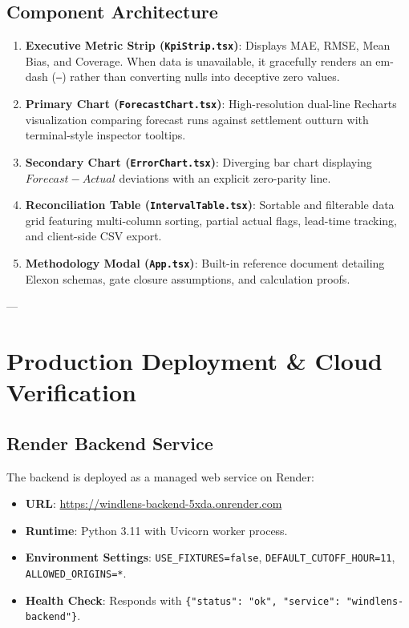 \documentclass[11pt,a4paper]{article}
\begin{document}
\subsection{Component Architecture}
\begin{enumerate}
    \item \textbf{Executive Metric Strip (\texttt{KpiStrip.tsx})}: Displays MAE, RMSE, Mean Bias, and Coverage. When data is unavailable, it gracefully renders an em-dash (\texttt{---}) rather than converting nulls into deceptive zero values.
    \item \textbf{Primary Chart (\texttt{ForecastChart.tsx})}: High-resolution dual-line Recharts visualization comparing forecast runs against settlement outturn with terminal-style inspector tooltips.
    \item \textbf{Secondary Chart (\texttt{ErrorChart.tsx})}: Diverging bar chart displaying $Forecast - Actual$ deviations with an explicit zero-parity line.
    \item \textbf{Reconciliation Table (\texttt{IntervalTable.tsx})}: Sortable and filterable data grid featuring multi-column sorting, partial actual flags, lead-time tracking, and client-side CSV export.
    \item \textbf{Methodology Modal (\texttt{App.tsx})}: Built-in reference document detailing Elexon schemas, gate closure assumptions, and calculation proofs.
\end{enumerate}

---

\section{Production Deployment \& Cloud Verification}

\subsection{Render Backend Service}
The backend is deployed as a managed web service on Render:
\begin{itemize}
    \item \textbf{URL}: \url{https://windlens-backend-5xda.onrender.com}
    \item \textbf{Runtime}: Python 3.11 with Uvicorn worker process.
    \item \textbf{Environment Settings}: \texttt{USE\_FIXTURES=false}, \texttt{DEFAULT\_CUTOFF\_HOUR=11}, \texttt{ALLOWED\_ORIGINS=*}.
    \item \textbf{Health Check}: Responds with \texttt{\{"status": "ok", "service": "windlens-backend"\}}.
\end{itemize}
\end{document}
